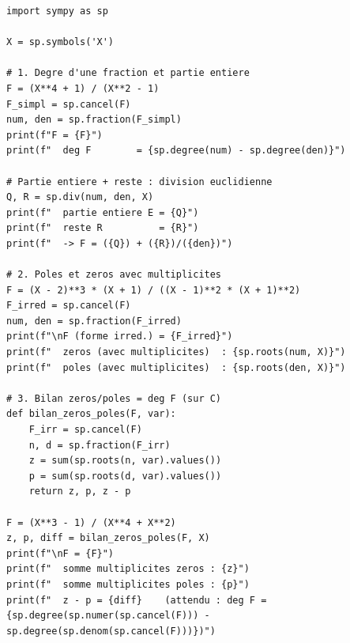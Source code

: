\documentclass[12pt,a4paper]{report}
\theoremstyle{definition}
\theoremstyle{remark}
\begin{document}
\begin{lstlisting}
import sympy as sp

X = sp.symbols('X')

# 1. Degre d'une fraction et partie entiere
F = (X**4 + 1) / (X**2 - 1)
F_simpl = sp.cancel(F)
num, den = sp.fraction(F_simpl)
print(f"F = {F}")
print(f"  deg F        = {sp.degree(num) - sp.degree(den)}")

# Partie entiere + reste : division euclidienne
Q, R = sp.div(num, den, X)
print(f"  partie entiere E = {Q}")
print(f"  reste R          = {R}")
print(f"  -> F = ({Q}) + ({R})/({den})")

# 2. Poles et zeros avec multiplicites
F = (X - 2)**3 * (X + 1) / ((X - 1)**2 * (X + 1)**2)
F_irred = sp.cancel(F)
num, den = sp.fraction(F_irred)
print(f"\nF (forme irred.) = {F_irred}")
print(f"  zeros (avec multiplicites)  : {sp.roots(num, X)}")
print(f"  poles (avec multiplicites)  : {sp.roots(den, X)}")

# 3. Bilan zeros/poles = deg F (sur C)
def bilan_zeros_poles(F, var):
    F_irr = sp.cancel(F)
    n, d = sp.fraction(F_irr)
    z = sum(sp.roots(n, var).values())
    p = sum(sp.roots(d, var).values())
    return z, p, z - p

F = (X**3 - 1) / (X**4 + X**2)
z, p, diff = bilan_zeros_poles(F, X)
print(f"\nF = {F}")
print(f"  somme multiplicites zeros : {z}")
print(f"  somme multiplicites poles : {p}")
print(f"  z - p = {diff}    (attendu : deg F = {sp.degree(sp.numer(sp.cancel(F))) - sp.degree(sp.denom(sp.cancel(F)))})")
\end{lstlisting}
\end{document}
